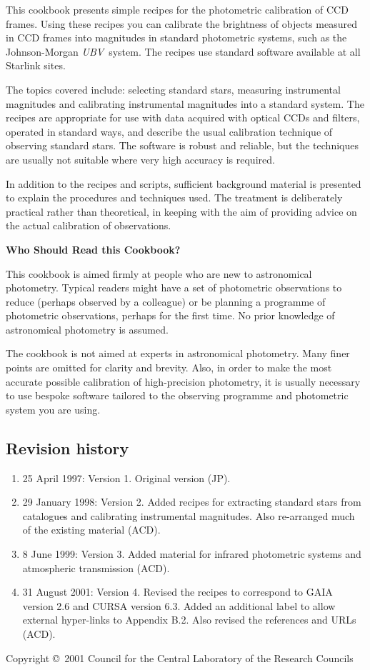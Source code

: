 \documentclass[twoside,11pt]{article}
\newcommand{\stardocinitials}  {SC}
\newcommand{\stardoccopyright} {Copyright \copyright\ 2001 Council for the
Central Laboratory of the Research Councils}
\newcommand{\stardocnumber}    {6.4}
\newcommand{\stardocabstract}
{This cookbook presents simple recipes for the photometric calibration
of CCD frames.  Using these recipes you can calibrate the brightness
of objects measured in CCD frames into magnitudes in standard
photometric systems, such as the Johnson-Morgan {\it UBV}\, system.
The recipes use standard software available at all Starlink sites.

The topics covered include: selecting standard stars, measuring
instrumental magnitudes and calibrating instrumental magnitudes into a
standard system.  The recipes are appropriate for use with data acquired
with optical CCDs and filters, operated in standard ways, and describe the
usual calibration technique of observing standard stars.  The software
is robust and reliable, but the techniques are usually not suitable where
very high accuracy is required.

In addition to the recipes and scripts, sufficient background material
is presented to explain the procedures and techniques used.  The
treatment is deliberately practical rather than theoretical, in keeping
with the aim of providing advice on the actual calibration of observations.

\latex{\vspace{5mm}}

\begin{center}
{\bf Who Should Read this Cookbook?}
\end{center}

This cookbook is aimed firmly at people who are new to astronomical
photometry.  Typical readers might have a set of photometric observations
to reduce (perhaps observed by a colleague) or be planning a programme of
photometric observations, perhaps for the first time.  No prior knowledge
of astronomical photometry is assumed.

The cookbook is not aimed at experts in astronomical photometry.  Many
finer points are omitted for clarity and brevity.  Also, in order to
make the most accurate possible calibration of high-precision photometry,
it is usually necessary to use bespoke software tailored to the
observing programme and photometric system you are using.}
\newcommand{\stardocname}{\stardocinitials /\stardocnumber}
\newenvironment{latexonly}{}{}
\newcommand{\html}[1]{}
\newcommand{\latex}[1]{#1}
\renewcommand{\thepage}{\roman{page}}
\begin{document}
\stardocabstract
\newpage

\latex{\subsection*{Revision history}}
\html{\section*{Revision history}}

\begin{enumerate}

   \item 25 April 1997: Version 1. Original version (JP).

   \item 29 January 1998: Version 2.  Added recipes for extracting
    standard stars from catalogues and calibrating instrumental
    magnitudes.  Also re-arranged much of the existing material (ACD).

   \item 8 June 1999: Version 3.  Added material for infrared
    photometric systems and atmospheric transmission (ACD).

   \item 31 August 2001: Version 4.  Revised the recipes to correspond to
    GAIA version 2.6 and CURSA version 6.3.  Added an additional label to
    allow external hyper-links to Appendix B.2.  Also revised the references
    and URLs (ACD).

\end{enumerate}

\vspace*{\fill}
\stardoccopyright

\cleardoublepage
\begin{latexonly}
   \setlength{\parskip}{0mm}
   \tableofcontents

   \newpage
   \listoffigures
   \listoftables

   \setlength{\parskip}{\medskipamount}
   \markboth{\stardocname}{\stardocname}
\end{latexonly}
\cleardoublepage
\newpage
\renewcommand{\thepage}{\arabic{page}}
\setcounter{page}{1}
\end{document}
